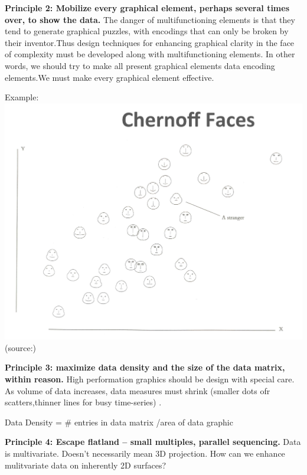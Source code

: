 \documentclass[]{book}
\theoremstyle{definition}
\theoremstyle{definition}
\theoremstyle{definition}
\theoremstyle{remark}
\begin{document}
\textbf{Principle 2: Mobilize every graphical element, perhaps several
times over, to show the data.} The danger of multifunctioning elements
is that they tend to generate graphical puzzles, with encodings that can
only be broken by their inventor.Thus design techniques for enhancing
graphical clarity in the face of complexity must be developed along with
multifunctioning elements. In other words, we should try to make all
present graphical elements data encoding elements.We must make every
graphical element effective.

Example: \includegraphics{images/Tufte_figure6.png}
(source:\citep{Tufte_2001})

\textbf{Principle 3: maximize data density and the size of the data
matrix, within reason.} High performation graphics should be design with
special care. As volume of data increases, data measures must shrink
(smaller dots ofr scatters,thinner lines for busy time-series)
\citep{best-practice}.

Data Density = \# entries in data matrix /area of data graphic

\textbf{Principle 4: Escape flatland -- small multiples, parallel
sequencing.} Data is multivariate. Doesn't necessarily mean 3D
projection. How can we enhance mulitvariate data on inherently 2D
surfaces?
\end{document}
